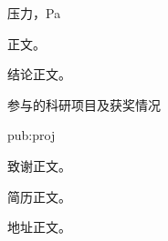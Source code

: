 {\hitif[lang=en]{\bilingualswapon}{\bilingualswapoff}
}

\cover
\titlepage
\begin{abstract}中文摘要正文。\end{abstract}
\begin{abstract}[lang=en]English abstract body.\end{abstract}
\begin{symbols}
\item[$p$] 压力，Pa
\end{symbols}
\listofabbreviations
\tableofcontents
{}
正文。
\begin{conclusions}结论正文。\end{conclusions}
\begin{achievements}
  \begin{pubgroup}{参与的科研项目及获奖情况}
    \item{pub:proj}
  \end{pubgroup}
\end{achievements}
\declarations
\begin{acknowledgements}致谢正文。\end{acknowledgements}
\begin{resume}简历正文。\end{resume}
\begin{permanentaddress}地址正文。\end{permanentaddress}

